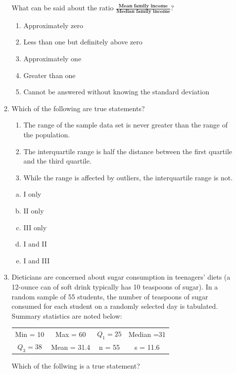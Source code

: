 \documentclass[a4paper,12pt,twoside]{book}
\begin{document}
\begin{itemize}
\begin{enumerate}
 What can be said about the ratio $\frac{\textbf{Mean family income}}{\textbf{Median family income}}$?
 
   \begin{enumerate}
     \item Approximately zero
     \item Less than one but definitely above zero
     \item Approximately one
     \item Greater than one
     \item Cannot be answered without knowing the standard deviation
   \end{enumerate}
 \vspace{0.3cm}
 
 \item Which of the following are true statements?
    \begin{enumerate}[\Roman*., start = 1]
      \item The range of the sample data set is never greater than the range of the population.
      \item The interquartile range is half the distance between the first quartile and the third quartile.
      \item  While the range is affected by outliers, the interquartile range is not. 
    \end{enumerate}
 \begin{enumerate}[(a), start = 1]
   \item I only
   \item II only
   \item III only
   \item I and II
   \item I and III
 \end{enumerate}
 \vspace{0.3cm}
 
 \item  Dieticians are concerned about sugar consumption in teenagers’ diets (a 12-ounce can of soft drink typically has 10 teaspoons of sugar). In a random sample of 55 students, the number of teaspoons of sugar consumed for each student on a randomly selected day is tabulated. Summary statistics are noted below:
 
   \begin{table}[H]
     \centering
     \begin{tabular}{cccc}
     Min = 10 & Max = 60 & $Q_1 = 25$ &  Median =31\\
     $Q_3 = 38$ & Mean = 31.4 & n = 55 & s = 11.6\\
     \end{tabular}
   \end{table}
 Which of the follwing is a true statement?
   

\end{enumerate}
\end{itemize}
\end{document}
